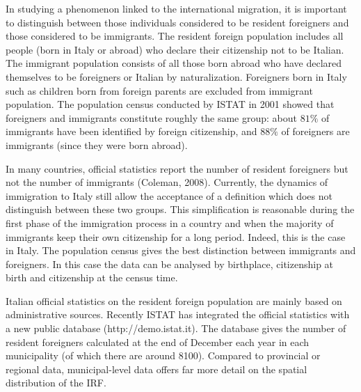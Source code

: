 \documentclass[12pt]{article}
\theoremstyle{definition}
\theoremstyle{plain}
\begin{document}
In studying a phenomenon linked to the international migration, it is important to distinguish between those individuals considered to be resident foreigners and those considered to be immigrants. The resident foreign population includes all people (born in Italy or abroad) who declare their citizenship not to be Italian. The immigrant population consists of all those born abroad who have declared themselves to be foreigners or Italian by naturalization. Foreigners born in Italy such as children born from foreign parents are excluded from immigrant population. The population census conducted by ISTAT in 2001 showed that foreigners and immigrants constitute roughly the same group: about $81\%$ of immigrants have been identified by foreign citizenship, and $88\%$ of foreigners are immigrants (since they were born abroad).

In many countries, official statistics report the number of resident foreigners but not the number of immigrants (Coleman, 2008). Currently, the dynamics of immigration to Italy still allow the acceptance of a definition which does not distinguish between these two groups. This simplification is reasonable during the first phase of the immigration process in a country and when the majority of immigrants keep their own citizenship for a long period. Indeed, this is the case in Italy. The population census gives the best distinction between immigrants and foreigners. In this case the data can be analysed by birthplace, citizenship at birth and citizenship at the census time. 
 
Italian official statistics on the resident foreign population are mainly based on administrative sources. Recently ISTAT has integrated the official statistics with a new public database (http://demo.istat.it). The database gives the number of resident foreigners calculated at the end of December each year in each municipality (of which there are around 8100). Compared to provincial or regional data, municipal-level data offers far more detail on the spatial distribution of the IRF.
 
\end{document}
